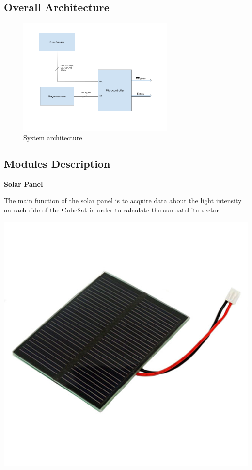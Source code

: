 \documentclass[a4paper, 12pt]{article}
\begin{document}
\subsection{Overall Architecture}
\begin{figure}[H]  %
    \centering
    \includegraphics[width=0.7\textwidth]{fig/Architecture_globale.png}
    \caption{System architecture}
    \label{fig:System architecture}
\end{figure}



\subsection{Modules Description}



\begin{minipage}{0.55\textwidth}
\textbf{Solar Panel} 

The main function of the solar panel is to acquire data about the light intensity on each side of the CubeSat in order to calculate the sun-satellite vector.

\end{minipage}
\hfill
\begin{minipage}{0.4\textwidth}
    \centering
    \includegraphics[width=0.5\linewidth]{fig/solarPanel.jpg}
    \label{fig:Solar Panel}
\end{minipage}
\end{document}
